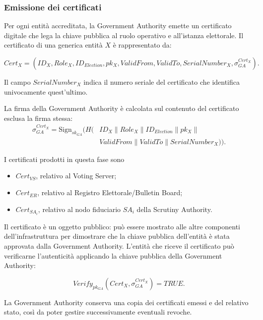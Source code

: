 \documentclass[a4paper,12pt]{article}
\begin{document}
\subsubsection{Emissione dei certificati}

Per ogni entit\`a accreditata, la Government Authority emette un certificato digitale che lega la chiave pubblica al ruolo operativo e all'istanza elettorale. 
Il certificato di una generica entit\`a \(X\) \`e rappresentato da:

\[
	Cert_X =
	(ID_X, Role_X, ID_{Election}, pk_X, ValidFrom, ValidTo, SerialNumber_X, \sigma_{GA}^{Cert_X}).
\]

Il campo $SerialNumber_X$ indica il numero seriale del certificato che identifica univocamente quest'ultimo.

La firma della Government Authority \`e calcolata sul contenuto del certificato esclusa la firma stessa:
\begin{equation}
\begin{split}
	\sigma_{GA}^{Cert_X} = \text{Sign}_{sk_{GA}}\Big(H(&ID_X \parallel Role_X
	\parallel ID_{Election} \parallel pk_X \parallel {}\\
	&ValidFrom \parallel ValidTo \parallel SerialNumber_X)\Big).
\end{split}
\end{equation}

I certificati prodotti in questa fase sono

\begin{itemize}
	\item \(Cert_{VS}\), relativo al Voting Server;
	\item \(Cert_{ER}\), relativo al Registro Elettorale/Bulletin Board;
	\item \(Cert_{SA_i}\), relativo al nodo fiduciario \(SA_i\) della Scrutiny Authority.
\end{itemize}

Il certificato \`e un oggetto pubblico: pu\`o essere mostrato alle altre componenti dell'infrastruttura per dimostrare che la chiave pubblica dell'entit\`a \`e stata approvata dalla Government Authority. 
L'entit\`a che riceve il certificato pu\`o verificarne l'autenticit\`a applicando la chiave pubblica della Government Authority:

\[
	Verify_{pk_{GA}}(Cert_X, \sigma_{GA}^{Cert_X}) = TRUE.
\]

La Government Authority conserva una copia dei certificati emessi e del relativo stato, cos\`i da poter gestire successivamente eventuali revoche.
\end{document}
